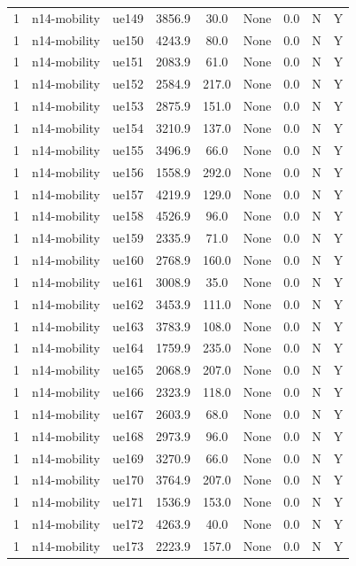 \begin{table}[ht]
\begin{tabular}{|c|c|c|c|c|c|c|c|c|}
1 & n14-mobility & ue149 & 3856.9 & 30.0 & None & 0.0 & N & Y \\
1 & n14-mobility & ue150 & 4243.9 & 80.0 & None & 0.0 & N & Y \\
1 & n14-mobility & ue151 & 2083.9 & 61.0 & None & 0.0 & N & Y \\
1 & n14-mobility & ue152 & 2584.9 & 217.0 & None & 0.0 & N & Y \\
1 & n14-mobility & ue153 & 2875.9 & 151.0 & None & 0.0 & N & Y \\
1 & n14-mobility & ue154 & 3210.9 & 137.0 & None & 0.0 & N & Y \\
1 & n14-mobility & ue155 & 3496.9 & 66.0 & None & 0.0 & N & Y \\
1 & n14-mobility & ue156 & 1558.9 & 292.0 & None & 0.0 & N & Y \\
1 & n14-mobility & ue157 & 4219.9 & 129.0 & None & 0.0 & N & Y \\
1 & n14-mobility & ue158 & 4526.9 & 96.0 & None & 0.0 & N & Y \\
1 & n14-mobility & ue159 & 2335.9 & 71.0 & None & 0.0 & N & Y \\
1 & n14-mobility & ue160 & 2768.9 & 160.0 & None & 0.0 & N & Y \\
1 & n14-mobility & ue161 & 3008.9 & 35.0 & None & 0.0 & N & Y \\
1 & n14-mobility & ue162 & 3453.9 & 111.0 & None & 0.0 & N & Y \\
1 & n14-mobility & ue163 & 3783.9 & 108.0 & None & 0.0 & N & Y \\
1 & n14-mobility & ue164 & 1759.9 & 235.0 & None & 0.0 & N & Y \\
1 & n14-mobility & ue165 & 2068.9 & 207.0 & None & 0.0 & N & Y \\
1 & n14-mobility & ue166 & 2323.9 & 118.0 & None & 0.0 & N & Y \\
1 & n14-mobility & ue167 & 2603.9 & 68.0 & None & 0.0 & N & Y \\
1 & n14-mobility & ue168 & 2973.9 & 96.0 & None & 0.0 & N & Y \\
1 & n14-mobility & ue169 & 3270.9 & 66.0 & None & 0.0 & N & Y \\
1 & n14-mobility & ue170 & 3764.9 & 207.0 & None & 0.0 & N & Y \\
1 & n14-mobility & ue171 & 1536.9 & 153.0 & None & 0.0 & N & Y \\
1 & n14-mobility & ue172 & 4263.9 & 40.0 & None & 0.0 & N & Y \\
1 & n14-mobility & ue173 & 2223.9 & 157.0 & None & 0.0 & N & Y \\

\end{tabular}
\end{table}
